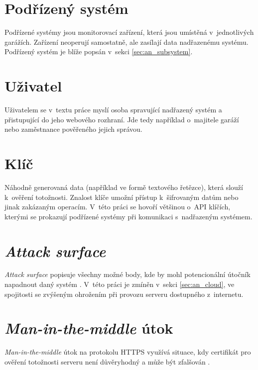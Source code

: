 \section{Podřízený systém}

Podřízené systémy jsou monitorovací zařízení, která jsou umístěná v~jednotlivých garážích. Zařízení neoperují samostatně, ale zasílají data nadřazenému systému. Podřízený systém je blíže popsán v~sekci \ref{sec:an_subsystem}.

\section{Uživatel}

Uživatelem se v~textu práce myslí osoba spravující nadřazený systém a přistupující do jeho webového rozhraní. Jde tedy například o~majitele garáží nebo zaměstnance pověřeného jejich správou.


\section{Klíč}

Náhodně generovaná data (například ve formě textového řetězce), která slouží k~ověření totožnosti. Znalost klíče umožní přístup k~šifrovaným datům nebo jinak zakázaným operacím. V~této práci se hovoří většinou o~API klíčích, kterými se prokazují podřízené systémy při komunikaci s~nadřazeným systémem.

\section{\textit{Attack surface}}

\textit{Attack surface} popisuje všechny možné body, kde by mohl potencionální útočník napadnout daný systém \cite{attack_surface_owasp}. V~této práci je zmíněn v~sekci \ref{sec:an_cloud}, ve spojitosti se zvýšeným ohrožením při provozu serveru dostupného z~internetu.

\section{\textit{Man-in-the-middle} útok}

\textit{Man-in-the-middle} útok na protokolu HTTPS využívá situace, kdy certifikát pro ověření totožnosti serveru není důvěryhodný a může být zfalšován \cite{mitm}. 

